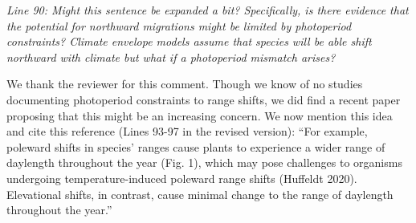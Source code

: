 \documentclass{article}
\begin{document}
\par \emph{Line 90: Might this sentence be expanded a bit? Specifically, is there evidence that the potential for northward migrations might be limited by photoperiod constraints? Climate envelope models assume that species will be able shift northward with climate but what if a photoperiod mismatch arises? }
\par We thank the reviewer for this comment. Though we know of no studies documenting photoperiod constraints to range shifts, we did find a recent paper proposing that this might be an increasing concern. We now mention this idea and cite this reference (Lines 93-97 in the revised version):
``For example, poleward shifts in species' ranges cause plants to experience a wider range of daylength throughout the year (Fig. 1), which may pose challenges to organisms undergoing temperature-induced poleward range shifts (Huffeldt 2020). Elevational shifts, in contrast, cause minimal change to the range of daylength throughout the year.''
\end{document}
